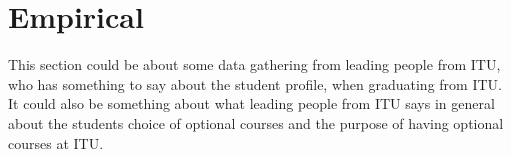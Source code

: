 \section{Empirical}
This section could be about some data gathering from leading people from ITU, who has something to say about the student profile, when graduating from ITU. It could also be something about what leading people from ITU says in general about the students choice of optional courses and the purpose of having optional courses at ITU. 